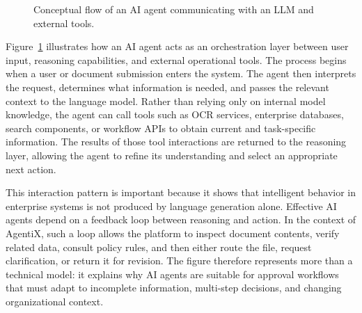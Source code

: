 \documentclass[12pt,oneside,openright,a4paper]{cpe-english-project}
\begin{document}
\begin{figure}[htbp]
\centering
{}
\caption{Conceptual flow of an AI agent communicating with an LLM and external tools.}
\label{fig:ai-agent-llm-tools}
\end{figure}

Figure~\ref{fig:ai-agent-llm-tools} illustrates how an AI agent acts as
an orchestration layer between user input, reasoning capabilities, and
external operational tools. The process begins when a user or document
submission enters the system. The agent then interprets the request,
determines what information is needed, and passes the relevant context
to the language model. Rather than relying only on internal model
knowledge, the agent can call tools such as OCR services, enterprise
databases, search components, or workflow APIs to obtain current and
task-specific information. The results of those tool interactions are
returned to the reasoning layer, allowing the agent to refine its
understanding and select an appropriate next action.

This interaction pattern is important because it shows that intelligent
behavior in enterprise systems is not produced by language generation
alone. Effective AI agents depend on a feedback loop between reasoning
and action. In the context of AgentiX, such a loop allows the platform
to inspect document contents, verify related data, consult policy rules,
and then either route the file, request clarification, or return it for
revision. The figure therefore represents more than a technical model:
it explains why AI agents are suitable for approval workflows that must
adapt to incomplete information, multi-step decisions, and changing
organizational context.
\end{document}
